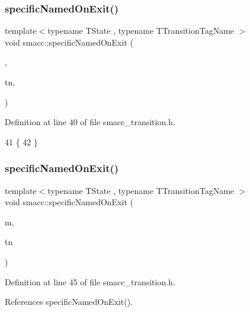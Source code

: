 \subsubsection{\texorpdfstring{specific\+Named\+On\+Exit()}{specificNamedOnExit()}\hspace{0.1cm}{\footnotesize\ttfamily [2/3]}}
{\footnotesize\ttfamily template$<$typename T\+State , typename T\+Transition\+Tag\+Name $>$ \\
void smacc\+::specific\+Named\+On\+Exit (\begin{DoxyParamCaption}\item[{T\+State \&}]{,  }\item[{T\+Transition\+Tag\+Name}]{tn,  }\item[{std\+::false\+\_\+type}]{ }\end{DoxyParamCaption})}



Definition at line 40 of file smacc\+\_\+transition.\+h.


\begin{DoxyCode}
41 \{
42 \}
\end{DoxyCode}
\mbox{\label{namespacesmacc_ad462e5c9a025fe42bb06de617fabeaa5}} 
\subsubsection{\texorpdfstring{specific\+Named\+On\+Exit()}{specificNamedOnExit()}\hspace{0.1cm}{\footnotesize\ttfamily [3/3]}}
{\footnotesize\ttfamily template$<$typename T\+State , typename T\+Transition\+Tag\+Name $>$ \\
void smacc\+::specific\+Named\+On\+Exit (\begin{DoxyParamCaption}\item[{T\+State \&}]{m,  }\item[{T\+Transition\+Tag\+Name}]{tn }\end{DoxyParamCaption})}



Definition at line 45 of file smacc\+\_\+transition.\+h.



References specific\+Named\+On\+Exit().


